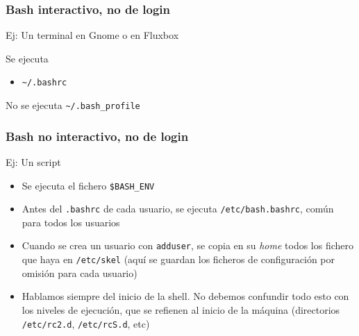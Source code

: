 \documentclass[ucs]{beamer}
\begin{document}
\begin{frame}[fragile]
\frametitle{Bash interactivo, no de login }

Ej: Un terminal en Gnome o en Fluxbox 

Se ejecuta
\begin{itemize}
\item
\begin{verbatim}
~/.bashrc
\end{verbatim}
\end{itemize}

No se ejecuta \verb|~/.bash_profile|

\end{frame}



\begin{frame}[fragile]
\frametitle{Bash no interactivo, no de login}

Ej: Un script
\begin{itemize}
\item Se ejecuta el fichero \verb|$BASH_ENV|
\end{itemize}


\end{frame}


\begin{frame}[fragile]
\begin{itemize}
\item
Antes del \verb|.bashrc| de cada usuario, se ejecuta \verb|/etc/bash.bashrc|,
común para todos los usuarios

\item
Cuando se crea un usuario con \verb|adduser|, se copia en
su \emph{home} todos los fichero que haya en \verb|/etc/skel| (aquí
se guardan los ficheros de configuración por omisión para cada usuario)

\item
Hablamos siempre del inicio de la shell.
No debemos confundir todo esto con los niveles de ejecución, 
que se refienen al inicio de la máquina
(directorios \verb|/etc/rc2.d|, \verb|/etc/rcS.d|, etc)

\end{itemize}

\end{frame}
\end{document}
